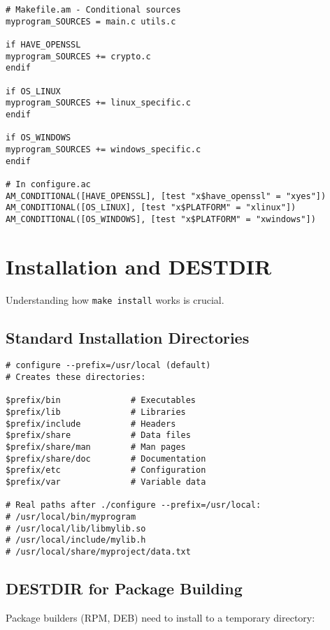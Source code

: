\begin{lstlisting}
# Makefile.am - Conditional sources
myprogram_SOURCES = main.c utils.c

if HAVE_OPENSSL
myprogram_SOURCES += crypto.c
endif

if OS_LINUX
myprogram_SOURCES += linux_specific.c
endif

if OS_WINDOWS
myprogram_SOURCES += windows_specific.c
endif

# In configure.ac
AM_CONDITIONAL([HAVE_OPENSSL], [test "x$have_openssl" = "xyes"])
AM_CONDITIONAL([OS_LINUX], [test "x$PLATFORM" = "xlinux"])
AM_CONDITIONAL([OS_WINDOWS], [test "x$PLATFORM" = "xwindows"])
\end{lstlisting}

\section{Installation and DESTDIR}

Understanding how \texttt{make install} works is crucial.

\subsection{Standard Installation Directories}

\begin{lstlisting}
# configure --prefix=/usr/local (default)
# Creates these directories:

$prefix/bin              # Executables
$prefix/lib              # Libraries
$prefix/include          # Headers
$prefix/share            # Data files
$prefix/share/man        # Man pages
$prefix/share/doc        # Documentation
$prefix/etc              # Configuration
$prefix/var              # Variable data

# Real paths after ./configure --prefix=/usr/local:
# /usr/local/bin/myprogram
# /usr/local/lib/libmylib.so
# /usr/local/include/mylib.h
# /usr/local/share/myproject/data.txt
\end{lstlisting}

\subsection{DESTDIR for Package Building}

Package builders (RPM, DEB) need to install to a temporary directory:

